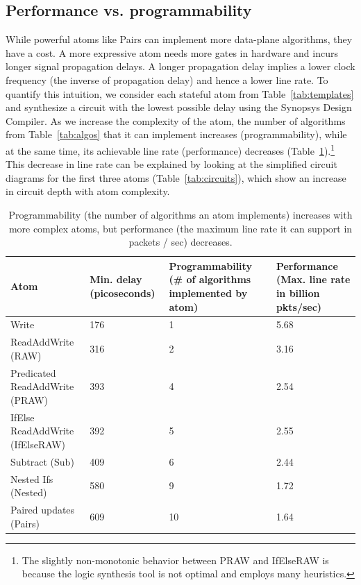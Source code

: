 \subsection{Performance vs. programmability}
\label{ss:perfprog}
While powerful atoms like Pairs can implement more data-plane algorithms, they
have a cost.  A more expressive atom needs more gates in hardware and incurs
longer signal propagation delays. A longer propagation delay implies a lower
clock frequency (the inverse of propagation delay) and hence a lower line rate.
To quantify this intuition, we consider each stateful atom from
Table~\ref{tab:templates} and synthesize a circuit with the lowest possible
delay using the Synopsys Design Compiler. As we increase the complexity of the
atom, the number of algorithms from Table~\ref{tab:algos} that it can implement
increases (programmability), while at the same time, its achievable line rate
(performance) decreases (Table~\ref{tab:perfprog}).\footnote{The slightly
non-monotonic behavior between PRAW and IfElseRAW is because the logic
synthesis tool is not optimal and employs many heuristics.} This decrease in
line rate can be explained by looking at the simplified circuit diagrams for
the first three atoms (Table~\ref{tab:circuits}), which show an increase in
circuit depth with atom complexity.

\begin{table}[!t]
  \begin{scriptsize}
  \begin{tabular}{|p{}|p{}|p{}|p{}|}
  \hline
  Atom & Min. delay (picoseconds) & Programmability (\# of algorithms implemented by atom) & Performance (Max. line rate in billion pkts/sec) \\
  \hline
  Write & 176 & 1  & 5.68 \\
  \hline
  ReadAddWrite (RAW) & 316 & 2 & 3.16\\
  \hline
  \pbox{0.1\textwidth}
  {Predicated\\
  ReadAddWrite (PRAW)} & 393 & 4 & 2.54 \\
  \hline
  IfElse ReadAddWrite (IfElseRAW) & 392 & 5 & 2.55 \\
  \hline
  Subtract (Sub) & 409 & 6 & 2.44 \\
  \hline
  Nested Ifs (Nested) & 580 & 9 & 1.72 \\
  \hline
  Paired updates (Pairs) & 609 & 10 & 1.64 \\
  \hline
  \end{tabular}
\end{scriptsize}
\caption{Programmability (the number of algorithms an atom implements)
increases with more complex atoms, but performance (the maximum line rate it
can support in packets / sec) decreases.}
\label{tab:perfprog}
\end{table}

